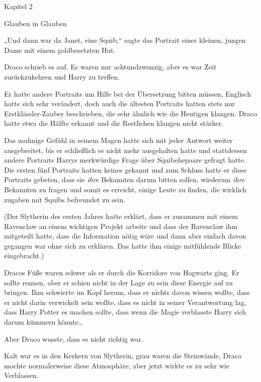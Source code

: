 

\hypertarget{glauben-in-glauben}{%

Kapitel 2

Glauben in Glauben

„Und dann war da Janet, eine Squib,“ sagte das Portrait einer kleinen, jungen Dame mit einem goldbesetzten Hut.

Draco schrieb es auf. Es waren nur achtundzwanzig, aber es war Zeit zurückzukehren und Harry zu treffen.

Er hatte andere Portraits um Hilfe bei der Übersetzung bitten müssen, Englisch hatte sich sehr verändert, doch auch die ältesten Portraits hatten stets nur Erstklässler-Zauber beschrieben, die sehr ähnlich wie die Heutigen klangen. Draco hatte etwa die Hälfte erkannt und die Restlichen klangen nicht stärker.

Das mulmige Gefühl in seinem Magen hatte sich mit jeder Antwort weiter ausgebreitet, bis er schließlich es nicht mehr ausgehalten hatte und stattdessen andere Portraits Harrys merkwürdige Frage über Squibehepaare gefragt hatte. Die ersten fünf Portraits hatten keines gekannt und zum Schluss hatte er diese Portraits gebeten, dass sie \emph{ihre} Bekannten darum bitten sollen, wiederum \emph{ihre} Bekannten zu fragen und somit es erreicht, einige Leute zu finden, die wirklich zugaben mit Squibs befreundet zu sein.

(Der Slytherin des ersten Jahres hatte erklärt, dass er zusammen mit einem Ravenclaw an einem wichtigen Projekt arbeite und dass der Ravenclaw ihm mitgeteilt hatte, dass die Information nötig wäre und dann aber einfach davon gegangen war ohne sich zu erklären. Das hatte ihm einige mitfühlende Blicke eingebracht.)

Dracos Füße waren schwer als er durch die Korridore von Hogwarts ging. Er sollte rennen, aber er schien nicht in der Lage zu sein diese Energie auf zu bringen. Ihm schwierte im Kopf herum, dass er nichts davon wissen wollte, dass er nicht darin verwickelt sein wollte, dass es nicht in seiner Verantwortung lag, dass Harry Potter es machen sollte, dass wenn die Magie verblasste Harry sich darum kümmern könnte…

Aber Draco wusste, dass es nicht richtig war.

Kalt war es in den Kerkern von Slytherin, grau waren die Steinwände, Draco mochte normalerweise diese Atmosphäre, aber jetzt wirkte es zu sehr wie Verblassen.

}
